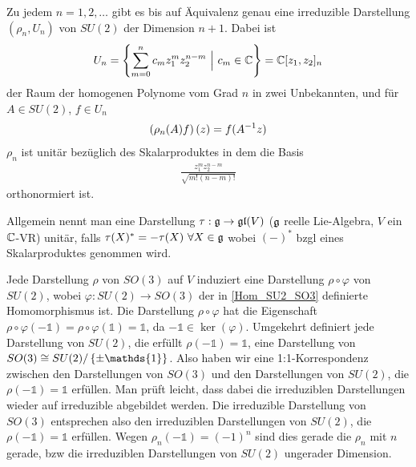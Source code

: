 \begin{satz}
    Zu jedem $n=1,2,\dots$ gibt es bis auf Äquivalenz genau eine irreduzible
    Darstellung $(\rho_n,U_n)$ von $SU(2)$ der Dimension $n+1$. Dabei ist
    \begin{align*}
        U_n = \left\{ \sum_{m=0}^n c_m z_1^m z_2^{n-m}
        \ \Big| \ c_m \in \mathbb{C} \right\} = \mathbb{C}[z_1,z_2]_n
    \end{align*}
    der Raum der homogenen Polynome vom Grad $n$ in zwei Unbekannten,
    und für $A \in SU(2)$, $f \in U_n$
    \begin{align*}
        \left( \rho_n (A)f \right)(z) = f(A^{-1} z)
    \end{align*}
    $\rho_n$ ist unitär bezüglich des Skalarproduktes in dem die Basis
    \begin{align*}
        \frac{z_1^m z_2^{n-m}}{\sqrt{m! (n-m)!}}
    \end{align*}
    orthonormiert ist.
\end{satz}

\begin{bemerkung}
    Allgemein nennt man eine Darstellung $\tau: \mathfrak{g} \rightarrow \mathfrak{gl}(V)$
    ($\mathfrak{g}$ reelle Lie-Algebra, $V$ ein $\mathbb{C}$-VR) unitär, falls $\tau(X)^\ast
    = - \tau(X) \ \forall X \in \mathfrak{g}$ wobei $(-)^\ast$ bzgl eines Skalarproduktes
    genommen wird.
\end{bemerkung}

\begin{bemerkung}
    Jede Darstellung $\rho$ von $SO(3)$ auf $V$ induziert eine Darstellung
    $\rho \circ \varphi$ von $SU(2)$, wobei $\varphi: SU(2) \rightarrow SO(3)$
    der in \ref{Hom_SU2_SO3} definierte Homomorphismus ist. Die Darstellung
    $\rho \circ \varphi$ hat die Eigenschaft $\rho \circ \varphi(-\mathds{1}) =
    \rho \circ \varphi(\mathds{1}) = \mathds{1}$, da $-\mathds{1} \in \ker(\varphi)$.
    Umgekehrt definiert jede Darstellung von $SU(2)$, die erfüllt $\rho(-\mathds{1})
    = \mathds{1}$, eine Darstellung von $SO(3) \cong SU(2) /
    \geschwungeneklammer{\pm \mathds{1}}$. Also haben wir eine 1:1-Korrespondenz
    zwischen den Darstellungen von $SO(3)$ und den Darstellungen von $SU(2)$,
    die $\rho(-\mathds{1}) = \mathds{1}$ erfüllen. Man prüft leicht, dass
    dabei die irreduziblen Darstellungen wieder auf irreduzible abgebildet werden.
    Die irreduzible Darstellung von $SO(3)$ entsprechen also den irreduziblen
    Darstellungen von $SU(2)$, die $\rho(-\mathds{1}) = \mathds{1}$ erfüllen.
    Wegen $\rho_n(-\mathds{1}) = (-1)^n$ sind dies gerade die $\rho_n$ mit
    $n$ gerade, bzw die irreduziblen Darstellungen von $SU(2)$ ungerader
    Dimension.
\end{bemerkung}

